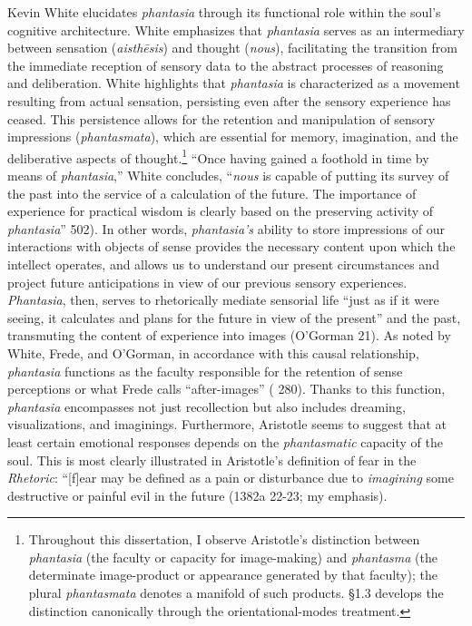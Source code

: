 \documentclass{article}
\begin{document}
Kevin White elucidates \textit{phantasia} through its functional role within the soul's cognitive architecture. White emphasizes that \textit{phantasia} serves as an intermediary between sensation (\textit{aisthēsis}) and thought (\textit{nous}), facilitating the transition from the immediate reception of sensory data to the abstract processes of reasoning and deliberation. White highlights that \textit{phantasia} is characterized as a movement resulting from actual sensation, persisting even after the sensory experience has ceased. This persistence allows for the retention and manipulation of sensory impressions (\textit{phantasmata}), which are essential for memory, imagination, and the deliberative aspects of thought.\footnote{Throughout this dissertation, I observe Aristotle's distinction between \textit{phantasia} (the faculty or capacity for image-making) and \textit{phantasma} (the determinate image-product or appearance generated by that faculty); the plural \textit{phantasmata} denotes a manifold of such products. \S1.3 develops the distinction canonically through the orientational-modes treatment.} ``Once having gained a foothold in time by means of \textit{phantasia},'' White concludes, ``\textit{nous} is capable of putting its survey of the past into the service of a calculation of the future. The importance of experience for practical wisdom is clearly based on the preserving activity of \textit{phantasia}'' \cite{white1985meaning} 502). In other words, \textit{phantasia's} ability to store impressions of our interactions with objects of sense provides the necessary content upon which the intellect operates, and allows us to understand our present circumstances and project future anticipations in view of our previous sensory experiences. \textit{Phantasia}, then, serves to rhetorically mediate sensorial life ``just as if it were seeing, it calculates and plans for the future in view of the present'' and the past, transmuting the content of experience into images (O'Gorman 21). As noted by White, Frede, and O'Gorman, in accordance with this causal relationship, \textit{phantasia} functions as the faculty responsible for the retention of sense perceptions or what Frede calls ``after-images'' (\cite{frede1992cognitive} 280). Thanks to this function, \textit{phantasia} encompasses not just recollection but also includes dreaming, visualizations, and imaginings. Furthermore, Aristotle seems to suggest that at least certain emotional responses depends on the \textit{phantasmatic} capacity of the soul. This is most clearly illustrated in Aristotle's definition of fear in the \textit{Rhetoric}: ``[f]ear may be defined as a pain or disturbance due to \textit{imagining} some destructive or painful evil in the future (1382a 22-23; my emphasis). 
\end{document}
